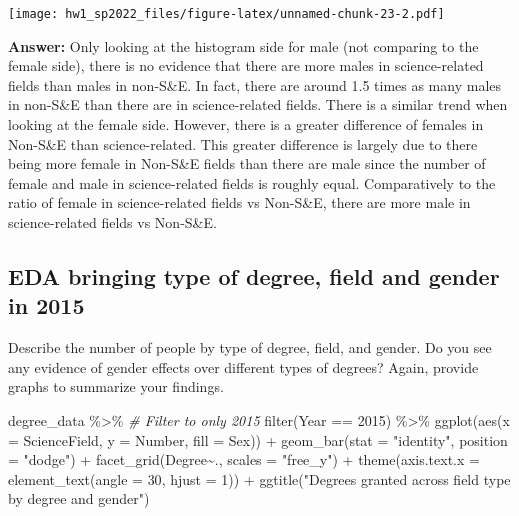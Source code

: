 \documentclass[
]{article}
\newenvironment{Shaded}{\begin{snugshade}}{\end{snugshade}}
\newcommand{\AttributeTok}[1]{\textcolor[rgb]{0.77,0.63,0.00}{#1}}
\newcommand{\CommentTok}[1]{\textcolor[rgb]{0.56,0.35,0.01}{\textit{#1}}}
\newcommand{\DecValTok}[1]{\textcolor[rgb]{0.00,0.00,0.81}{#1}}
\newcommand{\FunctionTok}[1]{\textcolor[rgb]{0.00,0.00,0.00}{#1}}
\newcommand{\NormalTok}[1]{#1}
\newcommand{\SpecialCharTok}[1]{\textcolor[rgb]{0.00,0.00,0.00}{#1}}
\newcommand{\StringTok}[1]{\textcolor[rgb]{0.31,0.60,0.02}{#1}}
\begin{document}
\texttt{[image: hw1\_sp2022\_files/figure-latex/unnamed-chunk-23-2.pdf]}

\textbf{Answer:} Only looking at the histogram side for male (not
comparing to the female side), there is no evidence that there are more
males in science-related fields than males in non-S\&E. In fact, there
are around 1.5 times as many males in non-S\&E than there are in
science-related fields. There is a similar trend when looking at the
female side. However, there is a greater difference of females in
Non-S\&E than science-related. This greater difference is largely due to
there being more female in Non-S\&E fields than there are male since the
number of female and male in science-related fields is roughly equal.
Comparatively to the ratio of female in science-related fields vs
Non-S\&E, there are more male in science-related fields vs Non-S\&E.

\hypertarget{eda-bringing-type-of-degree-field-and-gender-in-2015}{%
\subsection{EDA bringing type of degree, field and gender in
2015}\label{eda-bringing-type-of-degree-field-and-gender-in-2015}}

Describe the number of people by type of degree, field, and gender. Do
you see any evidence of gender effects over different types of degrees?
Again, provide graphs to summarize your findings.

\begin{Shaded}
\begin{Highlighting}[]
\NormalTok{degree\_data }\SpecialCharTok{\%\textgreater{}\%}
  \CommentTok{\# Filter to only 2015}
  \FunctionTok{filter}\NormalTok{(Year }\SpecialCharTok{==} \DecValTok{2015}\NormalTok{) }\SpecialCharTok{\%\textgreater{}\%}
  \FunctionTok{ggplot}\NormalTok{(}\FunctionTok{aes}\NormalTok{(}\AttributeTok{x =}\NormalTok{ ScienceField, }\AttributeTok{y =}\NormalTok{ Number, }\AttributeTok{fill =}\NormalTok{ Sex)) }\SpecialCharTok{+}
  \FunctionTok{geom\_bar}\NormalTok{(}\AttributeTok{stat =} \StringTok{"identity"}\NormalTok{, }\AttributeTok{position =} \StringTok{"dodge"}\NormalTok{) }\SpecialCharTok{+}
  \FunctionTok{facet\_grid}\NormalTok{(Degree}\SpecialCharTok{\textasciitilde{}}\NormalTok{., }\AttributeTok{scales =} \StringTok{"free\_y"}\NormalTok{) }\SpecialCharTok{+}
  \FunctionTok{theme}\NormalTok{(}\AttributeTok{axis.text.x =} \FunctionTok{element\_text}\NormalTok{(}\AttributeTok{angle =} \DecValTok{30}\NormalTok{, }\AttributeTok{hjust =} \DecValTok{1}\NormalTok{)) }\SpecialCharTok{+}
  \FunctionTok{ggtitle}\NormalTok{(}\StringTok{"Degrees granted across field type by degree and gender"}\NormalTok{)}
\end{Highlighting}
\end{Shaded}
\end{document}

